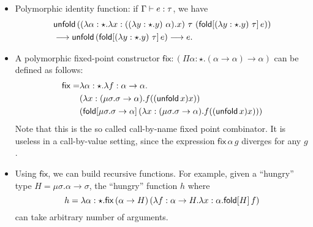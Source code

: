 \begin{itemize}
  \newcommand{\FPTypeU}{\mu\sigma . \sigma \to \alpha}
  \newcommand{\FPTermfxx}{\lambda x:(\FPTypeU).f((\unfold{x})x)}
  \newcommand{\FP}{\mathsf{fix}} %
\item Polymorphic identity function: if $\Gamma \vdash e:\tau$, we have
  \begin{align*}
  & \mathsf{unfold}\,((\lambda \alpha:\star.\lambda x:((\lambda y:\star.y)~\alpha).x)~\tau~(\mathsf{fold}[(\lambda y:\star.y)~\tau]\,e))\\ &\longrightarrow \mathsf{unfold}\,(\mathsf{fold}[(\lambda y:\star.y)~\tau]\,e) \longrightarrow e.
  \end{align*}
\item A polymorphic fixed-point constructor
  $\FP:(\Pi \alpha:\star.(\alpha \to \alpha) \to \alpha)$ can be
  defined as follows:
  \begin{align*}
    \FP=&\lambda \alpha:\star . \lambda f:\alpha \to \alpha.\\
        &(\FPTermfxx)\\
        &(\fold{\FPTypeU}{(\FPTermfxx)})
  \end{align*}
  Note that this is the so called call-by-name fixed point
  combinator. It is useless in a call-by-value setting, since the
  expression $\FP\,\alpha\,g$ diverges for any $g$.
  \newcommand{\HGType}{\mu\sigma. \alpha \to \sigma}%
\item Using $\FP$, we can build recursive functions. For example,
  given a ``hungry'' type $H=\HGType$, the ``hungry'' function $h$
  where
  \[h=\lambda \alpha:\star.\FP\,(\alpha \to H)\,(\lambda f:\alpha \to
  H.\lambda x:\alpha.\fold{H}{f})\]
  can take arbitrary number of arguments.
\end{itemize}

